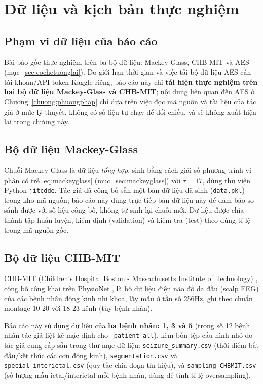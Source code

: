 \chapter{Dữ liệu và kịch bản thực nghiệm}
\label{chuong:dulieu}

\section{Phạm vi dữ liệu của báo cáo}

Bài báo gốc thực nghiệm trên ba bộ dữ liệu: Mackey-Glass, CHB-MIT và AES
(mục~\ref{sec:cochetuonglai}). Do giới hạn thời gian và việc tải bộ dữ liệu AES cần tài
khoản/API token Kaggle riêng, báo cáo này chỉ \textbf{tái hiện thực nghiệm trên hai bộ dữ liệu
Mackey-Glass và CHB-MIT}; nội dung liên quan đến AES ở Chương~\ref{chuong:phuongphap} chỉ dựa
trên việc đọc mã nguồn và tài liệu của tác giả ở mức lý thuyết, không có số liệu tự chạy để đối
chiếu, và sẽ không xuất hiện lại trong chương này.

\section{Bộ dữ liệu Mackey-Glass}

Chuỗi Mackey-Glass là dữ liệu \textit{tổng hợp}, sinh bằng cách giải số phương trình vi phân
có trễ \eqref{eq:mackeyglass} (mục~\ref{sec:mackeyglass}) với $\tau = 17$, dùng thư viện Python
\texttt{jitcdde}. Tác giả đã công bố sẵn một bản dữ liệu đã sinh (\texttt{data.pkl}) trong kho
mã nguồn; báo cáo này dùng trực tiếp bản dữ liệu này để đảm bảo so sánh được với số liệu công
bố, không tự sinh lại chuỗi mới. Dữ liệu được chia thành tập huấn luyện, kiểm định (validation)
và kiểm tra (test) theo đúng tỉ lệ trong mã nguồn gốc.

\section{Bộ dữ liệu CHB-MIT}

CHB-MIT (Children's Hospital Boston - Massachusetts Institute of Technology)
\cite{shoeb2009chbmit}, công bố công khai trên PhysioNet \cite{goldberger2000physionet}, là bộ
dữ liệu điện não đồ da đầu (scalp EEG) của các bệnh nhân động kinh nhi khoa, lấy mẫu ở tần số
256Hz, ghi theo chuẩn montage 10-20 với 18-23 kênh (tùy bệnh nhân).

Báo cáo này sử dụng dữ liệu của \textbf{ba bệnh nhân: 1, 3 và 5} (trong số 12 bệnh nhân tác giả
liệt kê mặc định cho \texttt{--patient all}), kèm bốn tệp cấu hình nhỏ do tác giả cung cấp sẵn
trong thư mục dữ liệu: \texttt{seizure\_summary.csv} (thời điểm bắt đầu/kết thúc các cơn động
kinh), \texttt{segmentation.csv} và \texttt{special\_interictal.csv} (quy tắc chia đoạn tín
hiệu), và \texttt{sampling\_CHBMIT.csv} (số lượng mẫu ictal/interictal mỗi bệnh nhân, dùng để
tính tỉ lệ oversampling).

